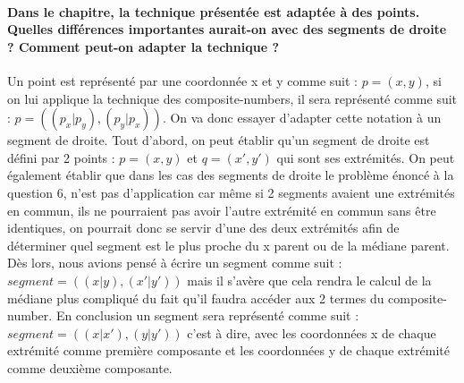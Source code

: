 \documentclass{article}
\begin{document}
    \paragraph{Dans le chapitre, la technique présentée est adaptée à des points. Quelles différences
    importantes aurait-on avec des segments de droite ? Comment peut-on adapter la technique ?}
    Un point est représenté par une coordonnée x et y comme suit : $p = (x,y)$, si on lui applique la technique des composite-numbers, il sera
    représenté comme suit : $p = ((p_x|p_y),(p_y|p_x))$. On va donc essayer d'adapter cette notation à un segment de droite. Tout d'abord, 
    on peut établir qu'un segment de droite est défini par 2 points : $p = (x,y)$ et $q=(x',y')$ qui sont ses extrémités. On peut également
    établir que dans les cas des segments de droite le problème énoncé à la question 6, n'est pas d'application car même si 2 segments avaient
    une extrémités en commun, ils ne pourraient pas avoir l'autre extrémité en commun sans être identiques, on pourrait donc se servir d'une 
    des deux extrémités afin de déterminer quel segment est le plus proche du x parent ou de la médiane parent. Dès lors, nous avions pensé
    à écrire un segment comme suit : $segment = ((x|y),(x'|y'))$ mais il s'avère que cela rendra le calcul de la médiane plus compliqué du fait
    qu'il faudra accéder aux 2 termes du composite-number. En conclusion un segment sera représenté comme suit : $segment = ((x|x'),(y|y'))$ c'est à dire,
    avec les coordonnées x de chaque extrémité comme première composante et les coordonnées y de chaque extrémité comme deuxième composante.
\end{document}

